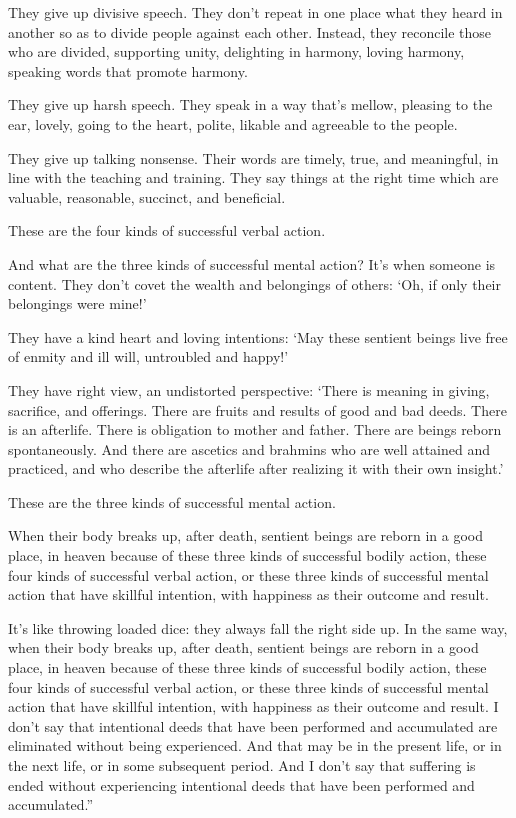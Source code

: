 \documentclass[12pt,openany]{book}%
\begin{document}
They give up divisive speech. They don’t repeat in one place what they heard in another so as to divide people against each other. Instead, they reconcile those who are divided, supporting unity, delighting in harmony, loving harmony, speaking words that promote harmony. 

They give up harsh speech. They speak in a way that’s mellow, pleasing to the ear, lovely, going to the heart, polite, likable and agreeable to the people. 

They give up talking nonsense. Their words are timely, true, and meaningful, in line with the teaching and training. They say things at the right time which are valuable, reasonable, succinct, and beneficial. 

These are the four kinds of successful verbal action. 

And what are the three kinds of successful mental action? It’s when someone is content. They don’t covet the wealth and belongings of others: ‘Oh, if only their belongings were mine!’ 

They have a kind heart and loving intentions: ‘May these sentient beings live free of enmity and ill will, untroubled and happy!’ 

They have right view, an undistorted perspective: ‘There is meaning in giving, sacrifice, and offerings. There are fruits and results of good and bad deeds. There is an afterlife. There is obligation to mother and father. There are beings reborn spontaneously. And there are ascetics and brahmins who are well attained and practiced, and who describe the afterlife after realizing it with their own insight.’ 

These are the three kinds of successful mental action. 

When their body breaks up, after death, sentient beings are reborn in a good place, in heaven because of these three kinds of successful bodily action, these four kinds of successful verbal action, or these three kinds of successful mental action that have skillful intention, with happiness as their outcome and result. 

It’s like throwing loaded dice: they always fall the right side up. In the same way, when their body breaks up, after death, sentient beings are reborn in a good place, in heaven because of these three kinds of successful bodily action, these four kinds of successful verbal action, or these three kinds of successful mental action that have skillful intention, with happiness as their outcome and result. I don’t say that intentional deeds that have been performed and accumulated are eliminated without being experienced. And that may be in the present life, or in the next life, or in some subsequent period. And I don’t say that suffering is ended without experiencing intentional deeds that have been performed and accumulated.” 
\end{document}
